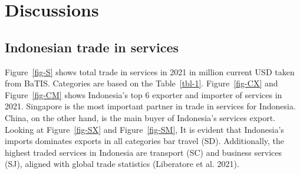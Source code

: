 \documentclass[
  a4paper,
  DIV=11,
  numbers=noendperiod]{scrreprt}
\begin{document}
\section{Discussions}\label{discussions}

\subsection{Indonesian trade in
services}\label{indonesian-trade-in-services}

Figure~\ref{fig-S} shows total trade in services in 2021 in million
current USD taken from BaTIS. Categories are based on the
Table~\ref{tbl-1}. Figure~\ref{fig-CX} and Figure~\ref{fig-CM} shows
Indonesia's top 6 exporter and importer of services in 2021. Singapore
is the most important partner in trade in services for Indonesia. China,
on the other hand, is the main buyer of Indonesia's services export.
Looking at Figure~\ref{fig-SX} and Figure~\ref{fig-SM}, It is evident
that Indonesia's imports dominates exports in all categories bar travel
(SD). Additionally, the highest traded services in Indonesia are
transport (SC) and business services (SJ), aligned with global trade
statistics (Liberatore et al. 2021).
\end{document}
